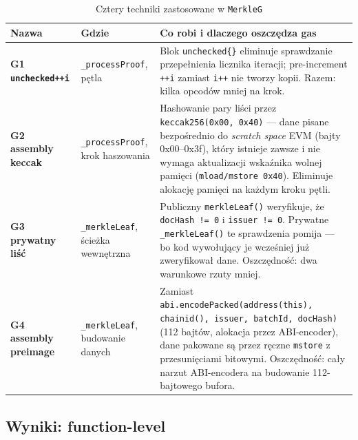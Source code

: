 \documentclass[11pt,a4paper]{article}
\begin{document}
\begin{table}[H]
\centering
\caption{Cztery techniki zastosowane w \texttt{MerkleG}}
\begin{tabular}{>{\bfseries}p{2.8cm} p{4.0cm} p{7.0cm}}
\toprule
Nazwa & Gdzie & Co robi i dlaczego oszczędza gas \\
\midrule
G1 \newline \texttt{unchecked++i}
  & \texttt{\_processProof}, pętla
  & Blok \texttt{unchecked\{\}} eliminuje sprawdzanie przepełnienia
    licznika iteracji; pre-increment \texttt{++i} zamiast \texttt{i++}
    nie tworzy kopii. Razem: kilka opcodów mniej na krok. \\[4pt]

G2 \newline assembly keccak
  & \texttt{\_processProof}, krok haszowania
  & Hashowanie pary liści przez \texttt{keccak256(0x00, 0x40)} ---
    dane pisane bezpośrednio do \emph{scratch space} EVM (bajty 0x00--0x3f),
    który istnieje zawsze i nie wymaga aktualizacji wskaźnika wolnej pamięci
    (\texttt{mload/mstore 0x40}). Eliminuje alokację pamięci na każdym kroku pętli. \\[4pt]

G3 \newline prywatny liść
  & \texttt{\_merkleLeaf}, ścieżka wewnętrzna
  & Publiczny \texttt{merkleLeaf()} weryfikuje, że \texttt{docHash != 0}
    i \texttt{issuer != 0}. Prywatne \texttt{\_merkleLeaf()} te sprawdzenia
    pomija --- bo kod wywołujący je wcześniej już zweryfikował dane.
    Oszczędność: dwa warunkowe rzuty mniej. \\[4pt]

G4 \newline assembly preimage
  & \texttt{\_merkleLeaf}, budowanie danych
  & Zamiast \texttt{abi.encodePacked(address(this), chainid(), issuer, batchId, docHash)}
    (112 bajtów, alokacja przez ABI-encoder), dane pakowane są przez ręczne
    \texttt{mstore} z przesunięciami bitowymi. Oszczędność: cały narzut
    ABI-encodera na budowanie 112-bajtowego bufora. \\
\bottomrule
\end{tabular}
\end{table}

\subsection{Wyniki: function-level}
\end{document}
